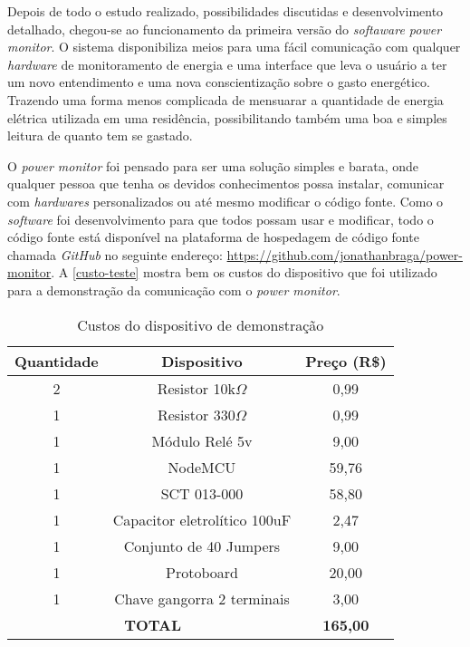 Depois de todo o estudo realizado, possibilidades discutidas e desenvolvimento detalhado, chegou-se ao  funcionamento da primeira versão
do \textit{softaware power monitor}. O sistema disponibiliza meios para uma fácil comunicação com qualquer \textit{hardware} de monitoramento
de energia e uma interface que leva o usuário a ter um novo entendimento e uma nova conscientização sobre o gasto energético. Trazendo uma forma menos
complicada de mensuarar a quantidade de energia elétrica utilizada em uma residência, possibilitando também uma boa e simples leitura de quanto tem se gastado.

O \textit{power monitor} foi pensado para ser uma solução simples e barata, onde qualquer pessoa que tenha os devidos conhecimentos possa 
instalar, comunicar com \textit{hardwares} personalizados ou até mesmo modificar o código fonte. Como o \textit{software} foi desenvolvimento 
para que todos possam usar e modificar, todo o código fonte está disponível na plataforma de hospedagem de código fonte chamada 
\textit{GitHub} no seguinte endereço: \url{https://github.com/jonathanbraga/power-monitor}{}. A \autoref{custo-teste} mostra bem os 
custos do dispositivo que foi utilizado para a demonstração da comunicação com o \textit{power monitor}.


\begin{table}[!ht]
	\centering
	\begin{tabular}{ccc}
		\hline
		\textbf{Quantidade} & \textbf{Dispositivo}               & \textbf{Preço (R\$)}                 \\ \hline
		\rowcolor[HTML]{DDDDDD} 
		2                   & Resistor 10k$\Omega$ & 0,99                                 \\
		1                   & Resistor 330$\Omega$ & 0,99                                 \\
		\rowcolor[HTML]{DDDDDD} 
		1                   & Módulo Relé 5v                     & 9,00                                 \\
		1                   & NodeMCU                            & 59,76                                \\
		\rowcolor[HTML]{DDDDDD} 
		1                   & SCT 013-000                        & 58,80                                \\
		1                   & Capacitor eletrolítico 100uF       & 2,47                                 \\
		\rowcolor[HTML]{DDDDDD} 
		1                   & Conjunto de 40 Jumpers             & 9,00                                 \\
		1                   & Protoboard             & 20,00                                 \\
		1                   & Chave gangorra 2 terminais         & 3,00                                 \\ \hline
		\multicolumn{2}{|c|}{\textbf{TOTAL}}                     & \multicolumn{1}{c|}{\textbf{165,00}} \\ \hline
	\end{tabular}
	\caption{Custos do dispositivo de demonstração}
	\label{custo-teste}
\end{table} 